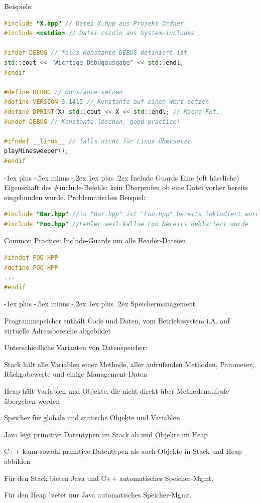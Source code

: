\documentclass[10pt]{article}
\makeatletter
\renewcommand{\subsubsection}{\@startsection{subsubsection}{3}{0mm}%
                                {-1ex plus -.5ex minus -.2ex}%
                                {1ex plus .2ex}%
                                {\normalfont\small\bfseries}}
\makeatother
\begin{document}
Beispiele: 
\begin{lstlisting}[language=C++]
#include "X.hpp" // Datei X.hpp aus Projekt-Ordner
#include <cstdio> // Datei cstdio aus System-Includes

#ifdef DEBUG // falls Konstante DEBUG definiert ist
std::cout << "Wichtige Debugausgabe" << std::endl;
#endif

#define DEBUG // Konstante setzen
#define VERSION 3.1415 // Konstante auf einen Wert setzen
#define DPRINT(X) std::cout << X << std::endl; // Macro-Fkt.
#undef DEBUG // Konstante löschen, good practice!

#ifndef __linux__ // falls nicht für Linux übersetzt
playMinesweeper();
#endif
\end{lstlisting}

\subsubsection{Include Guards}
Eine (oft hässliche) Eigenschaft des \#include-Befehls: kein Überprüfen ob eine Datei vorher bereits eingebunden wurde. Problematisches Beispiel:
\begin{lstlisting}[language=C++]
#include "Bar.hpp" //in "Bar.hpp" ist "Foo.hpp" bereits inkludiert worden
#include "Foo.hpp" //Fehler weil kallse Foo bereits deklariert wurde
\end{lstlisting}

Common Practice: Include-Guards um alle Header-Dateien
\begin{lstlisting}[language=C++]
#ifndef FOO_HPP
#define FOO_HPP
...
#endif
\end{lstlisting}

\subsubsection{Speichermanagement}
\begin{itemize*}
  \item Programmspeicher enthält Code und Daten, vom Betriebssystem i.A. auf virtuelle Adressbereiche abgebildet
  \item Unterschiedliche Varianten von Datenspeicher:
  \begin{itemize*}
    \item Stack hält alle Variablen einer Methode, aller aufrufenden Methoden, Parameter, Rückgabewerte und einige Management-Daten
    \item Heap hält Variablen und Objekte, die nicht direkt über Methodenaufrufe übergeben werden
    \item Speicher für globale und statische Objekte und Variablen
  \end{itemize*}
  \item Java legt primitive Datentypen im Stack ab und Objekte im Heap
  \item C++ kann sowohl primitive Datentypen als auch Objekte in Stack und Heap abbilden
  \item Für den Stack bieten Java und C++ automatisches Speicher-Mgmt.
  \item Für den Heap bietet nur Java automatisches Speicher-Mgmt.
\end{itemize*}
\end{document}
